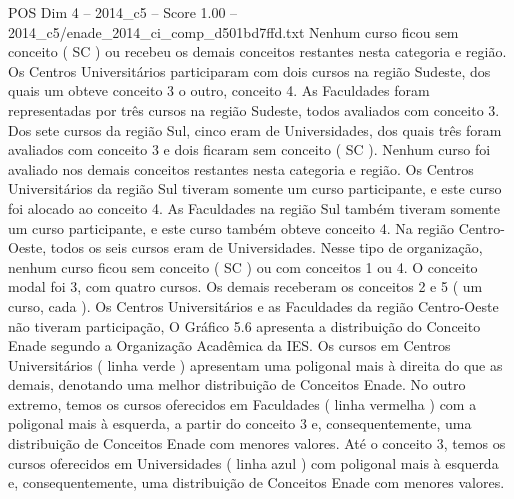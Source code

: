 \begin{textsample}{POS Dim 4 – 2014\_c5 – Score 1.00 – 2014\_c5/enade\_2014\_ci\_comp\_d501bd7ffd.txt}
Nenhum curso ficou sem conceito ( SC ) ou recebeu os demais conceitos restantes nesta categoria e região.
Os Centros Universitários participaram com dois cursos na região Sudeste, dos quais um obteve conceito 3 o outro, conceito 4.
As Faculdades foram representadas por três cursos na região Sudeste, todos avaliados com conceito 3.
Dos sete cursos da região Sul, cinco eram de Universidades, dos quais três foram avaliados com conceito 3 e dois ficaram sem conceito ( SC ).
Nenhum curso foi avaliado nos demais conceitos restantes nesta categoria e região.
Os Centros Universitários da região Sul tiveram somente um curso participante, e este curso foi alocado ao conceito 4.
As Faculdades na região Sul também tiveram somente um curso participante, e este curso também obteve conceito 4.
Na região Centro-Oeste, todos os seis cursos eram de Universidades.
Nesse tipo de organização, nenhum curso ficou sem conceito ( SC ) ou com conceitos 1 ou 4.
O conceito modal foi 3, com quatro cursos.
Os demais receberam os conceitos 2 e 5 ( um curso, cada ).
Os Centros Universitários e as Faculdades da região Centro-Oeste não tiveram participação, O Gráfico 5.6 apresenta a distribuição do Conceito Enade segundo a Organização Acadêmica da IES.
Os cursos em Centros Universitários ( linha verde ) apresentam uma poligonal mais à direita do que as demais, denotando uma melhor distribuição de Conceitos Enade.
No outro extremo, temos os cursos oferecidos em Faculdades ( linha vermelha ) com a poligonal mais à esquerda, a partir do conceito 3 e, consequentemente, uma distribuição de Conceitos Enade com menores valores.
Até o conceito 3, temos os cursos oferecidos em Universidades ( linha azul ) com poligonal mais à esquerda e, consequentemente, uma distribuição de Conceitos Enade com menores valores.

\end{textsample}
